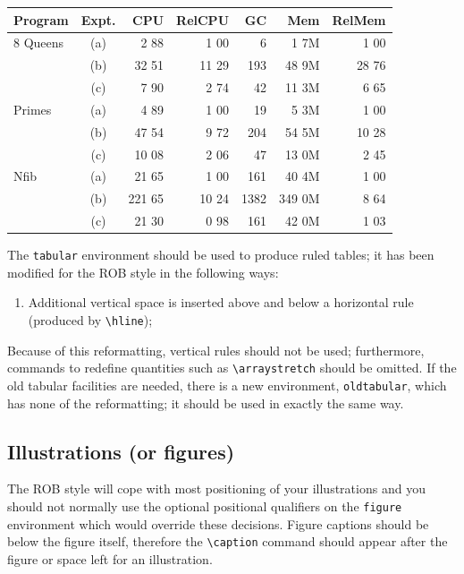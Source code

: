 \documentclass[DTMColor]{ROB-New}
\begin{document}
\begin{table}[h!]
 {\begin{fntable}\centering
    \begin{tabular}{@{\extracolsep{\fill}}lcrrrrr}
    \hline
     Program& Expt.&CPU&RelCPU&GC& Mem&RelMem\\
    \hline
    8 Queens& (a)&   2 88&  1 00&    6&   1 7M&  1 00\\
    &         (b)&  32 51& 11 29&  193&  48 9M& 28 76\\
    &         (c)&   7 90&  2 74&   42&  11 3M&  6 65\\
    Primes&   (a)&   4 89&  1 00&   19&   5 3M&  1 00\\
    &         (b)&  47 54&  9 72&  204&  54 5M& 10 28\\
    &         (c)&  10 08&  2 06&   47&  13 0M&  2 45\\
    Nfib&     (a)&  21 65&  1 00&  161&  40 4M&  1 00\\
    &         (b)& 221 65& 10 24& 1382& 349 0M&  8 64\\
    &         (c)&  21 30&  0 98&  161&  42 0M&  1 03\\
    \hline
    \end{tabular}
  \end{fntable}}
\end{table}

The \verb"tabular" environment should be used to produce ruled tables;
it has been modified for the ROB style in the following ways:
\begin{enumerate}
  \item Additional vertical space is inserted above and below a horizontal rule
        (produced by \verb"\hline");
\end{enumerate}
Because of this reformatting, vertical rules should not be used;
furthermore, commands to
redefine quantities such as \verb"\arraystretch" should be omitted. If
the old tabular facilities are needed, there is a new environment,
\verb"oldtabular", which has none of the reformatting; it should be used
in exactly the same way.

\subsection{Illustrations (or figures)}

The ROB style will cope with most positioning of your illustrations
and you should not normally use the optional positional qualifiers on
the \verb"figure" environment which would override these decisions.
Figure captions should be below the figure itself, therefore the \verb"\caption"
command should appear after the figure or space left for an illustration.
\end{document}
